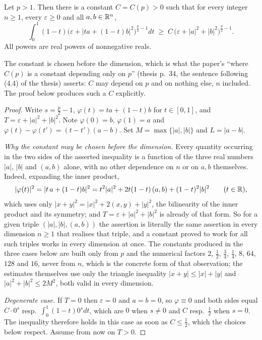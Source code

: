 \begin{helper}
Let $p>1$.  Then there is a constant $C=C(p)>0$ such that for every integer
$n\ge1$, every $\varepsilon\ge0$ and all $a,b\in\mathbb{R}^n$,
\[
\int_0^1(1-t)\bigl(\varepsilon+|ta+(1-t)b|^2\bigr)^{\frac p2-1}dt
\;\ge\;C\,\bigl(\varepsilon+|a|^2+|b|^2\bigr)^{\frac p2-1} .
\]
All powers are real powers of nonnegative reals.

The constant is chosen before the dimension, which is what the paper's
``where $C(p)$ is a constant depending only on $p$'' (thesis p.~34, the
sentence following (4.4) of the thesis) asserts: $C$ may depend on $p$ and on nothing
else, $n$ included.  The proof below produces such a $C$ explicitly.
\end{helper}
\begin{proof}
Write $s=\frac p2-1$, $\varphi(t)=ta+(1-t)b$ for $t\in[0,1]$, and
$T=\varepsilon+|a|^2+|b|^2$.  Note $\varphi(0)=b$, $\varphi(1)=a$ and
$\varphi(t)-\varphi(t')=(t-t')(a-b)$.  Set $M=\max\{|a|,|b|\}$ and $L=|a-b|$.

\emph{Why the constant may be chosen before the dimension.}  Every quantity
occurring in the two sides of the asserted inequality is a function of the three
real numbers $|a|$, $|b|$ and $(a,b)$ alone, with no other dependence on $n$ or
on $a,b$ themselves.  Indeed, expanding the inner product,
\[
|\varphi(t)|^2=|t\,a+(1-t)b|^2
=t^2|a|^2+2t(1-t)\,(a,b)+(1-t)^2|b|^2
\qquad(t\in\mathbb{R}),
\]
which uses only $|x+y|^2=|x|^2+2(x,y)+|y|^2$, the bilinearity of the inner
product and its symmetry; and $T=\varepsilon+|a|^2+|b|^2$ is already of that
form.  So for a given triple $(|a|,|b|,(a,b))$ the assertion is literally the
same assertion in every dimension $n\ge1$ that realises that triple, and a
constant proved to work for all such triples works in every dimension at once.
The constants produced in the three cases below are built only from $p$ and the
numerical factors $2$, $\tfrac12$, $\tfrac34$, $\tfrac14$, $8$, $64$, $128$ and
$16$, never from $n$, which is the concrete form of that observation; the
estimates themselves use only the triangle inequality $|x+y|\le|x|+|y|$ and
$|a|^2+|b|^2\le2M^2$, both valid in every dimension.

\emph{Degenerate case.}  If $T=0$ then $\varepsilon=0$ and $a=b=0$, so
$\varphi\equiv0$ and both sides equal $C\cdot0^{s}$ resp.\
$\int_0^1(1-t)0^{s}dt$, which are $0$ when $s\ne0$ and $C$ resp.\ $\tfrac12$
when $s=0$.  The inequality therefore holds in this case as soon as
$C\le\tfrac12$, which the choices below respect.  Assume from now on $T>0$.


\end{proof}
